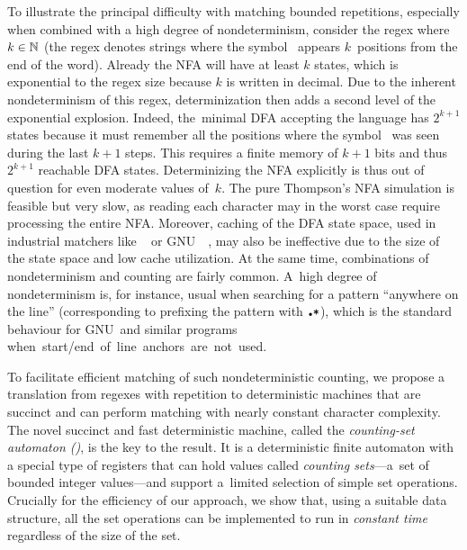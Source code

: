 \documentclass[acmsmall,screen]{acmart}
\begin{document}
To illustrate the principal difficulty with matching bounded repetitions,
especially when combined with a high degree of nondeterminism, 
consider the regex  where $k\in\mathbb{N}$ (the regex
denotes strings where the symbol~
appears $k$~positions from the end of the word).
Already the NFA will have at least $k$ states, which is exponential to the regex
size because $k$ is written in decimal. 
%
Due to the inherent nondeterminism of this regex, determinization then adds a second level of the exponential explosion.  
Indeed, the~minimal DFA accepting
the language has $2^{k+1}$ states because it must remember all the
positions where the symbol~ was seen during the last $k+1$ steps.  This
requires a finite memory of $k+1$ bits and thus $2^{k+1}$ reachable
DFA states. 
Determinizing the NFA explicitly is thus out of question for even moderate values
of~$k$. 
The pure Thompson's NFA simulation is feasible but very 
slow, as reading each character may in the
worst case require processing the entire NFA.
Moreover, caching of the DFA state space, used in industrial
matchers like
\retwo~\cite{re2} or GNU~\grep~\cite{grep},
may also be ineffective due to the size of the state space and
low cache utilization.
At the same time, combinations of nondeterminism and counting are
fairly common. A~high degree of nondeterminism is, for instance, usual when
searching for a pattern ``anywhere on the line'' (corresponding to prefixing the
pattern with $\regex{\DOT*}$), which is the standard behaviour for GNU~\grep and
similar programs \mbox{when start/end of line anchors are not used.}

To facilitate efficient matching of such nondeterministic counting,  
we propose a translation from regexes with repetition to deterministic
machines that are succinct and can perform matching with nearly constant character complexity.
%
The novel succinct and fast deterministic machine, called the \emph{counting-set
automaton (\CSA)}, is the key to the result.
%
It is a deterministic finite automaton with a special type of registers that
can hold values called \emph{counting sets}---a~set of bounded integer
values---and
%
support a~limited selection of simple set operations. 
%
Crucially for the efficiency of our approach,
we show that, using a suitable data structure, all
the set operations can be implemented to run in \emph{constant time} regardless of the size of the set.
\end{document}
